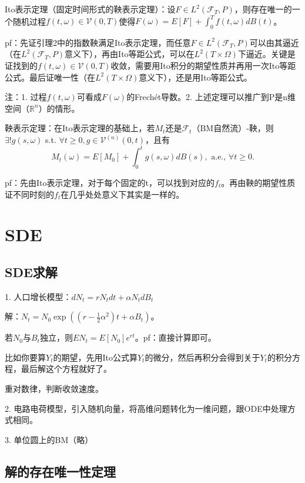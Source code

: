 Ito表示定理（固定时间形式的鞅表示定理）：设$F \in L^{2}(\mathcal{F}_{T}, P)$，则存在唯一的一个随机过程$f(t, \omega) \in \mathcal{V}(0, T)$使得$F(\omega)=E[F]+\int_{0}^{T} f(t, \omega) d B(t)$。

pf：先证引理2中的指数鞅满足Ito表示定理，而任意$F \in L^{2}(\mathcal{F}_{T}, P)$可以由其逼近（在$L^{2}(\mathcal{F}_{T}, P)$意义下），再由Ito等距公式，可以在$L^{2}(T \times \Omega)$下逼近。关键是证找到的$f(t, \omega) \in \mathcal{V}(0, T)$收敛，需要用Ito积分的期望性质并再用一次Ito等距公式。最后证唯一性（在$L^{2}(T \times \Omega)$意义下），还是用Ito等距公式。

注：1. 过程$f(t, \omega)$可看成$F(\omega)$的Frechét导数。2. 上述定理可以推广到P是n维空间（$\mathbb{R}^n$）的情形。

鞅表示定理：在Ito表示定理的基础上，若$M_t$还是$\mathcal{F}_t$（BM自然流）-鞅，则$\exists!g(s, \omega)$ s.t. $\forall t \ge 0, g \in \mathcal{V}^{(n)}(0, t)$，且有
\[
  M_{t}(\omega)=E\left[M_{0}\right]+\int_{0}^{t} g(s, \omega) d B(s), \text{ a.e., } \forall t \ge 0.
\]

pf：先由Ito表示定理，对于每个固定的t，可以找到对应的$f_t$。再由鞅的期望性质证不同时刻的$f_t$在几乎处处意义下其实是一样的。

\section{SDE}

\subsection{SDE求解}

1. 人口增长模型：$d N_{t}=r N_{t} d t+\alpha N_{t} d B_{t}$

解：$N_{t}=N_{0} \exp \left(\left(r-\frac{1}{2} \alpha^{2}\right) t+\alpha B_{t}\right)$。

若$N_{0}$与$B_{t}$独立，则$E N_{t}=E\left[N_{0}\right] e^{r t}$。pf：直接计算即可。

比如你要算$Y_t$的期望，先用Ito公式算$Y_t$的微分，然后再积分会得到关于$Y_t$的积分方程，最后解这个方程就好了。

重对数律，判断收敛速度。

2. 电路电荷模型，引入随机向量，将高维问题转化为一维问题，跟ODE中处理方式相同。

3. 单位圆上的BM（略）

\subsection{解的存在唯一性定理}

